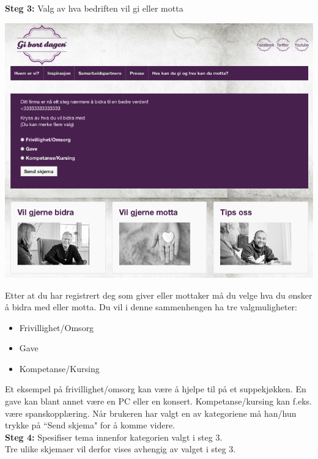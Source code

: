 {\bf Steg 3:} Valg av hva bedriften vil gi eller motta
\begin{center}
\includegraphics[clip=true, width=1 \textwidth,
trim=0cm 0cm 0cm 0cm]{valg1.png}
\label{fig:bidra}
\end{center}

Etter at du har registrert deg som giver eller mottaker må du velge hva du ønsker å bidra med eller motta. Du vil i denne sammenhengen ha tre valgmuligheter:\\

\begin{itemize}
    \item Frivillighet/Omsorg
    \item Gave
    \item Kompetanse/Kursing
\end{itemize}
Et eksempel på frivillighet/omsorg kan være å hjelpe til på et suppekjøkken. En gave kan blant annet være en PC eller en konsert. Kompetanse/kursing kan f.eks. være spanskopplæring. Når brukeren har valgt en av kategoriene må han/hun trykke på ``Send skjema" for å komme videre.\\

{\bf Steg 4:} Spesifiser tema innenfor kategorien valgt i steg 3.\\
Tre ulike skjemaer vil derfor vises avhengig av valget i steg 3.\\

